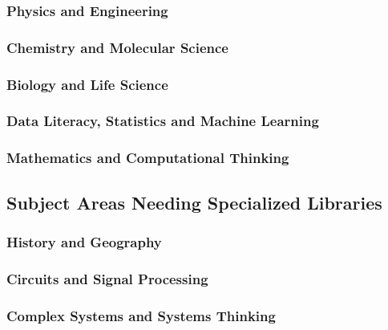 \subsubsection{Physics and Engineering}

\subsubsection{Chemistry and Molecular Science}

\subsubsection{Biology and Life Science}

\subsubsection{Data Literacy, Statistics and Machine Learning}

\subsubsection{Mathematics and Computational Thinking}

\subsection{Subject Areas Needing Specialized Libraries}

\subsubsection{History and Geography}

\subsubsection{Circuits and Signal Processing}

\subsubsection{Complex Systems and Systems Thinking}


